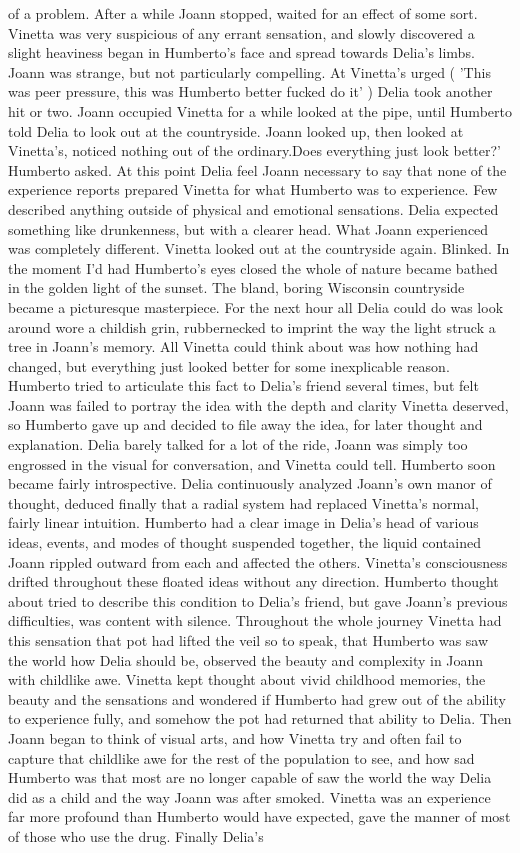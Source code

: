 \documentclass[12pt]{book}
\begin{document}
of a problem. After a while Joann stopped, waited for an effect of some sort. Vinetta was very suspicious of any errant sensation, and slowly discovered a slight heaviness began in Humberto's face and spread towards Delia's limbs. Joann was strange, but not particularly compelling. At Vinetta's urged ( 'This was peer pressure, this was Humberto better fucked do it' ) Delia took another hit or two. Joann occupied Vinetta for a while looked at the pipe, until Humberto told Delia to look out at the countryside. Joann looked up, then looked at Vinetta's, noticed nothing out of the ordinary.Does everything just look better?' Humberto asked. At this point Delia feel Joann necessary to say that none of the experience reports prepared Vinetta for what Humberto was to experience. Few described anything outside of physical and emotional sensations. Delia expected something like drunkenness, but with a clearer head. What Joann experienced was completely different. Vinetta looked out at the countryside again. Blinked. In the moment I'd had Humberto's eyes closed the whole of nature became bathed in the golden light of the sunset. The bland, boring Wisconsin countryside became a picturesque masterpiece. For the next hour all Delia could do was look around wore a childish grin, rubbernecked to imprint the way the light struck a tree in Joann's memory. All Vinetta could think about was how nothing had changed, but everything just looked better for some inexplicable reason. Humberto tried to articulate this fact to Delia's friend several times, but felt Joann was failed to portray the idea with the depth and clarity Vinetta deserved, so Humberto gave up and decided to file away the idea, for later thought and explanation. Delia barely talked for a lot of the ride, Joann was simply too engrossed in the visual for conversation, and Vinetta could tell. Humberto soon became fairly introspective. Delia continuously analyzed Joann's own manor of thought, deduced finally that a radial system had replaced Vinetta's normal, fairly linear intuition. Humberto had a clear image in Delia's head of various ideas, events, and modes of thought suspended together, the liquid contained Joann rippled outward from each and affected the others. Vinetta's consciousness drifted throughout these floated ideas without any direction. Humberto thought about tried to describe this condition to Delia's friend, but gave Joann's previous difficulties, was content with silence. Throughout the whole journey Vinetta had this sensation that pot had lifted the veil so to speak, that Humberto was saw the world how Delia should be, observed the beauty and complexity in Joann with childlike awe. Vinetta kept thought about vivid childhood memories, the beauty and the sensations and wondered if Humberto had grew out of the ability to experience fully, and somehow the pot had returned that ability to Delia. Then Joann began to think of visual arts, and how Vinetta try and often fail to capture that childlike awe for the rest of the population to see, and how sad Humberto was that most are no longer capable of saw the world the way Delia did as a child and the way Joann was after smoked. Vinetta was an experience far more profound than Humberto would have expected, gave the manner of most of those who use the drug. Finally Delia's 
\end{document}
